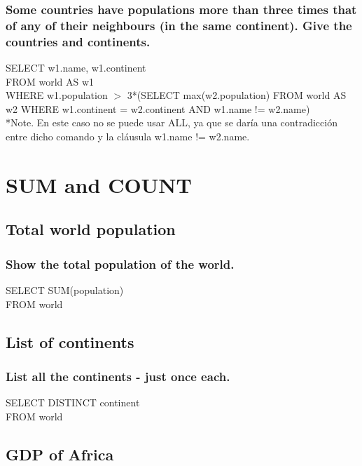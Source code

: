 \documentclass[10pt, oneside]{article}
\begin{document}
\subsubsection{\color{red}Some countries have populations more than three times that of any of their neighbours (in the same continent). Give the countries and continents.}

SELECT w1.name, w1.continent\\
FROM world AS w1\\
WHERE w1.population $>$ 3*(SELECT max(w2.population) FROM world AS w2 WHERE w1.continent = w2.continent AND w1.name != w2.name)\\

\color{blue}*Note. \color{black}En este caso no se puede usar ALL, ya que se daría  una contradicción entre dicho comando y la cláusula w1.name != w2.name.

\section{SUM and COUNT}

\subsection{Total world population}

\subsubsection{Show the total population of the world.}

SELECT SUM(population) \\
FROM world\\

\subsection{List of continents}

\subsubsection{List all the continents - just once each.}

SELECT DISTINCT continent\\
FROM world\\

\subsection{GDP of Africa}
\end{document}
